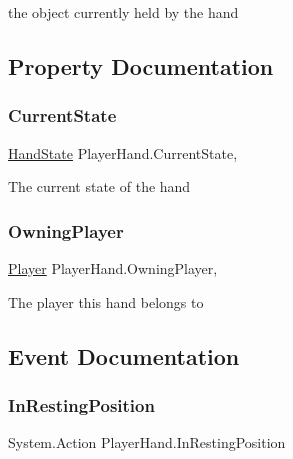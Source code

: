 the object currently held by the hand 



\subsection{Property Documentation}
\mbox{\label{class_player_hand_a6eb1eff28793294622f4037a0aa7afeb}} 
\subsubsection{\texorpdfstring{Current\+State}{CurrentState}}
{\footnotesize\ttfamily \mbox{\hyperlink{class_player_hand_a1af76750da713cbc88856161d8d5ac0e}{Hand\+State}} Player\+Hand.\+Current\+State\hspace{0.3cm}{\ttfamily [get]}, {}}



The current state of the hand 

\mbox{\label{class_player_hand_a0d33095483c291ac3dd5b5350974b626}} 
\subsubsection{\texorpdfstring{Owning\+Player}{OwningPlayer}}
{\footnotesize\ttfamily \mbox{\hyperlink{class_player}{Player}} Player\+Hand.\+Owning\+Player\hspace{0.3cm}{\ttfamily [get]}, {\ttfamily [set]}}



The player this hand belongs to 



\subsection{Event Documentation}
\mbox{\label{class_player_hand_aebb1dc8370e71ba7b9965ffa0d4a2532}} 
\subsubsection{\texorpdfstring{In\+Resting\+Position}{InRestingPosition}}
{\footnotesize\ttfamily System.\+Action Player\+Hand.\+In\+Resting\+Position}



